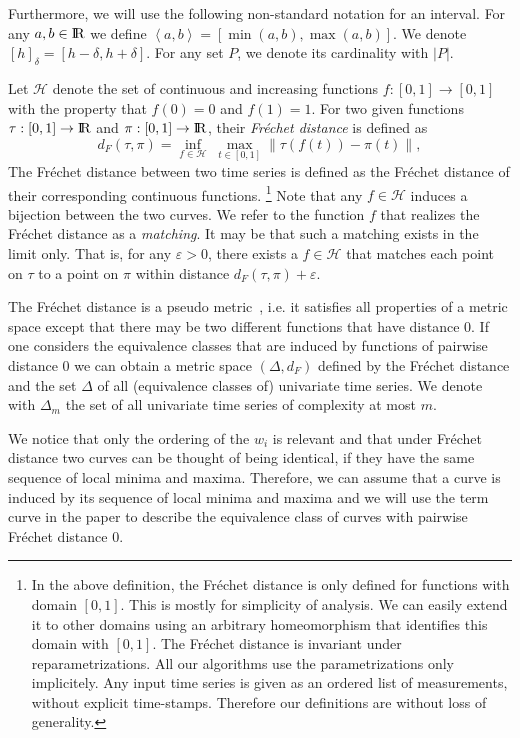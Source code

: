 \documentclass[11pt, letter]{article}
\newcommand{\Frechet}{Fr\'echet\xspace}
\providecommand{\eps}{{\varepsilon}}\newcommand{\Astop}{\overline{a}}
\providecommand{\pth}[2][\!]{#1\left({#2}\right)}
\providecommand{\cbrc}[1]{\left\langle{#1}\right\rangle}
\newcommand{\pbrc}[1]{\left[ {#1} \right]}
\renewcommand{\Re}{{\rm I\!\hspace{-0.025em} R}}
\newcommand{\distFr}[2]{\ensuremath{d_F\pth{#1,#2}}}
\newcommand{\distFrConst}{\ensuremath{d_F}}
\newcommand{\range}[2]{\ensuremath{[#1]_{#2}}}
\begin{document}
Furthermore, we will use the following non-standard notation for an interval.
For any $a,b\in \Re$ we define $\cbrc{a,b}=\pbrc{\min(a,b), \max(a,b)}$. 
We denote $\range{h}{\delta}=[h-\delta, h+\delta]$. For any
set $P$, we denote its cardinality with $|P|$.


Let $\mathcal H$ denote the set of continuous and increasing functions
$f:[0,1]\rightarrow[0,1]$ with the property that $f(0)=0$ and $f(1)=1$. 
For two given functions
$\tau:[0,1]\rightarrow \Re$ and $\pi:[0,1]\rightarrow \Re$,
their \emph{\Frechet distance} is defined as 
\begin{equation} \label{def:frechet} 
\distFr{\tau}{\pi}=\inf_{f\in \mathcal H}\; \max_{t \in [0,1]} \| \tau(f(t))-\pi(t)
\|,
\end{equation}
The \Frechet{} distance between two time series is defined as the \Frechet{} distance
of their corresponding 
continuous functions.
\footnote{
In the above definition, the \Frechet{} distance is only defined for functions with domain $[0,1]$.
This is mostly for simplicity of analysis.
We can easily extend it to other domains using an arbitrary homeomorphism that identifies this domain with $[0,1]$. 
The \Frechet{} distance is invariant under reparametrizations. 
All our algorithms use the parametrizations only implicitely. Any input time
series is given as an ordered list of measurements, without explicit
time-stamps. Therefore our definitions are without loss of generality.
}
Note that any $f \in \mathcal H$ induces a bijection between the two curves.
We refer to the function $f$ that realizes the \Frechet distance as a
\emph{matching}. It may be that such a matching exists in the limit only. That
is, for any $\eps>0$, there exists a $f\in \mathcal H$ that matches each point
on $\tau$ to a point on $\pi$ within distance $\distFr{\tau}{\pi}+\eps$.



The \Frechet{} distance is a pseudo metric~\cite{ag-cfdbt-95}, i.e. it satisfies all properties of
a metric space except that there may be two different functions that have distance
$0$. If one considers the equivalence classes that are induced by functions of pairwise
distance $0$ we can obtain a metric space $(\Delta,\distFrConst)$ defined by the \Frechet
distance and the set $\Delta$ of all (equivalence classes of) univariate time series.
We denote with $\Delta_m$ the set of all univariate time series of complexity at
most $m$.

We notice that only the ordering of the $w_i$ is relevant and that under \Frechet distance two curves can be thought of being identical, if they have the same sequence of local minima and maxima. Therefore, we can assume that a curve is induced by its sequence of local minima and maxima and we will use the term curve in the paper to describe the equivalence class of curves with pairwise \Frechet distance 0.
\end{document}
